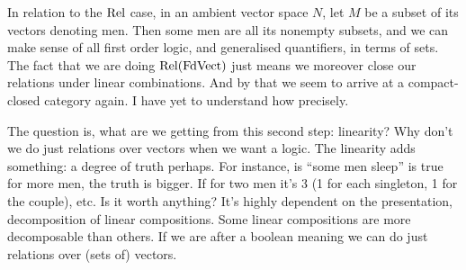 In relation to the $\mathrm{Rel}$ case, in an ambient vector space $N$, let
$M$ be a subset of its vectors denoting men. Then some men are all its
nonempty subsets, and we can make sense of all first order logic, and
generalised quantifiers, in terms of sets. The fact that we are doing
$\mathrm{Rel}(\mathrm{FdVect})$ just means we moreover close our relations under
linear combinations. And by that we seem to arrive at a compact-closed
category again. I have yet to understand how precisely.


The question is, what are we getting from this second step:
linearity? Why don't we do just relations over vectors when we want a
logic. The linearity adds something: a degree of truth perhaps. For
instance, is ``some men sleep'' is true for more men, the truth is
bigger. If for two men it's 3 (1 for each singleton, 1 for the
couple), etc. Is it worth anything? It's highly dependent on the
presentation, decomposition of linear compositions. Some linear
compositions are more decomposable than others. 
If we are after a boolean meaning
we can do just relations over (sets of) vectors. 




